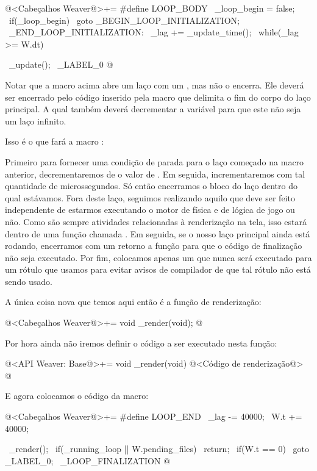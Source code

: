 \iniciocodigo
@<Cabeçalhos Weaver@>+=
#define LOOP_BODY                                            \
  _loop_begin =  false;                                      \
  if(_loop_begin)                                            \
    goto _BEGIN_LOOP_INITIALIZATION;                         \
_END_LOOP_INITIALIZATION:                                    \
  _lag += _update_time();                                    \
  while(_lag >= W.dt){                                       \
    _update();                                               \
_LABEL_0
@
\fimcodigo

Notar que a macro acima abre um laço com um \monoespaco{while}, mas
não o encerra. Ele deverá ser encerrado pelo código inserido pela
macro que delimita o fim do corpo do laço principal. A qual também
deverá decrementar a variável  para que este não
seja um laço infinito.


Isso é o que fará a macro \monoespaco{LOOP\_END}:

Primeiro para fornecer uma condição de parada para o laço começado na
macro anterior, decrementaremos de \monoespaco{\_lag} o valor
de \monoespaco{W.dt}. Em seguida, incrementaremos  com
tal quantidade de microssegundos. Só então encerramos o bloco do laço
dentro do qual estávamos. Fora deste laço, seguimos realizando aquilo
que deve ser feito independente de estarmos executando o motor de
física e de lógica de jogo ou não. Como são sempre atividades
relacionadas à renderização na tela, isso estará dentro de uma função
chamada \monoespaco{\_render}. Em seguida, se o nosso laço principal
ainda está rodando, encerramos com um retorno a função para que o
código de finalização não seja executado. Por fim, colocamos apenas
um \monoespaco{goto} que nunca será executado para um rótulo que
usamos para evitar avisos de compilador de que tal rótulo não está
sendo usado.

A única coisa nova que temos aqui então é a função de renderização:

\iniciocodigo
@<Cabeçalhos Weaver@>+=
void _render(void);
@
\fimcodigo

Por hora ainda não iremos definir o código a ser executado nesta
função:

\iniciocodigo
@<API Weaver: Base@>+=
void _render(void){
  @<Código de renderização@>
}
@
\fimcodigo

E agora colocamos o código da macro:

\iniciocodigo
@<Cabeçalhos Weaver@>+=
#define LOOP_END                                           \
    _lag -=  40000;                                        \
    W.t +=  40000;                                         \
  }                                                        \
  _render();                                               \
  if(_running_loop || W.pending_files)                     \
    return;                                                \
  if(W.t == 0)                                             \
    goto _LABEL_0;                                         \
_LOOP_FINALIZATION
@
\fimcodigo


